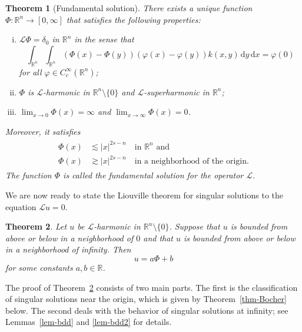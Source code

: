 \documentclass[11pt]{amsart}
\theoremstyle{plain}
\newtheorem{theorem}{Theorem}[section]
\theoremstyle{definition}
\numberwithin{equation}{section}
\begin{document}
\begin{theorem}[Fundamental solution]\label{thm-FS}
There exists a unique function $\Phi: \mathbb{R}^n \to [0, \infty]$ that satisfies the following properties\/\textup{:}
\begin{enumerate}[(i)]
\item\label{eq-FS1}
$\mathcal{L}\Phi = \delta_0$ in $\mathbb{R}^n$ in the sense that
\begin{equation*}
\int_{\mathbb{R}^n} \int_{\mathbb{R}^n} (\Phi(x)-\Phi(y))(\varphi(x)-\varphi(y)) k(x, y) \,\mathrm{d}y \,\mathrm{d}x= \varphi(0)
\end{equation*}
for all $\varphi \in C^\infty_c(\mathbb{R}^n)$\textup{;}
\item\label{eq-FS2}
$\Phi$ is $\mathcal{L}$-harmonic in $\mathbb{R}^n \setminus \{0\}$ and $\mathcal{L}$-superharmonic in $\mathbb{R}^n$\textup{;}
\item\label{eq-FS3}
$\lim_{x \to 0} \Phi(x) = \infty$ and $\lim_{x \to \infty} \Phi(x) = 0$.
\end{enumerate}
Moreover, it satisfies
\begin{align}\label{eq-FS-bounds}
\begin{split}
\Phi(x) &\lesssim |x|^{2s-n} \quad\text{in }\mathbb{R}^n\text{ and} \\
\Phi(x) &\gtrsim |x|^{2s-n} \quad\text{in a neighborhood of the origin}.
\end{split}
\end{align}
The function $\Phi$ is called the \emph{fundamental solution} for the operator $\mathcal{L}$.
\end{theorem}

We are now ready to state the Liouville theorem for singular solutions to the equation $\mathcal{L}u=0$.

\begin{theorem}\label{thm-sing-Liouv-L}
Let $u$ be $\mathcal{L}$-harmonic in $\mathbb{R}^n \setminus \{0\}$. Suppose that $u$ is bounded from above or below in a neighborhood of $0$ and that $u$ is bounded from above or below in a neighborhood of infinity. Then
\begin{equation*}
u=a\Phi+b
\end{equation*}
for some constants $a, b \in \mathbb{R}$.
\end{theorem}

The proof of Theorem~\ref{thm-sing-Liouv-L} consists of two main parts. The first is the classification of singular solutions near the origin, which is given by Theorem~\ref{thm-Bocher} below. The second deals with the behavior of singular solutions at infinity; see Lemmas~\ref{lem-bdd} and \ref{lem-bdd2} for details.
\end{document}
